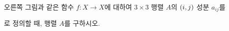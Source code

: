 \noindent\begin{minipage}[t]{0.58\linewidth}\vspace{0pt}\raggedright 오른쪽 그림과 같은 함수 $f:X\longrightarrow X$에 대하여 $3\times 3$ 행렬 $A$의 $(i{,}\mkern3mu\mathopen{}j)$ 성분 $a_{ij}$를\par\smallskip\end{minipage}\hfill\begin{minipage}[t]{0.4\linewidth}\vspace{0pt}\centering \resizebox{\ifdim\width>\linewidth\linewidth\else\width\fi}{!}{}\end{minipage}\par
\noindent {}\par\smallskip\noindent 로 정의할 때, 행렬 $A$를 구하시오.
